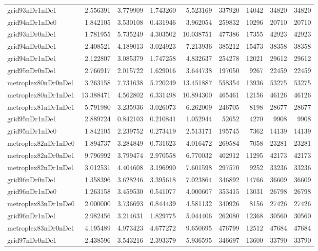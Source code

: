 \begin{longtable}{|l|r|r|r|r|r|r|r|r|}
grid93nDr1nDe1 & 2.556391 & 3.779909 & 1.743260 & 5.523169 & 337920 & 14042 & 34820 & 34820 \\
grid94nDr1nDe0 & 1.842105 & 3.530108 & 0.431946 & 3.962054 & 259832 & 10296 & 20710 & 20710 \\
grid93nDr0nDe1 & 1.781955 & 5.735249 & 4.303502 & 10.038751 & 477386 & 17355 & 42923 & 42923 \\
grid94nDr0nDe1 & 2.408521 & 4.189013 & 3.024923 & 7.213936 & 385212 & 15473 & 38358 & 38358 \\
grid94nDr1nDe1 & 2.122807 & 3.085379 & 1.747258 & 4.832637 & 254278 & 12021 & 29612 & 29612 \\
grid95nDr0nDe1 & 2.766917 & 2.015722 & 1.629016 & 3.644738 & 197050 & 9267 & 22459 & 22459 \\
metroplex80nDr0nDe1 & 3.263158 & 7.731638 & 5.720249 & 13.451887 & 558354 & 13936 & 53275 & 53275 \\
metroplex80nDr1nDe1 & 13.388471 & 4.562802 & 6.331498 & 10.894300 & 465461 & 12156 & 46126 & 46126 \\
metroplex81nDr1nDe1 & 5.791980 & 3.235936 & 3.026073 & 6.262009 & 246705 & 8198 & 28677 & 28677 \\
grid95nDr1nDe1 & 2.889724 & 0.842103 & 0.210841 & 1.052944 & 52652 & 4270 & 9908 & 9908 \\
grid95nDr1nDe0 & 1.842105 & 2.239752 & 0.273419 & 2.513171 & 195745 & 7362 & 14139 & 14139 \\
metroplex82nDr1nDe0 & 1.894737 & 3.284849 & 0.731623 & 4.016472 & 269584 & 7058 & 23281 & 23281 \\
metroplex82nDr0nDe1 & 9.796992 & 3.799474 & 2.970558 & 6.770032 & 402912 & 11295 & 42173 & 42173 \\
metroplex82nDr1nDe1 & 3.012531 & 4.404608 & 3.196990 & 7.601598 & 297570 & 9252 & 33236 & 33236 \\
grid96nDr0nDe1 & 1.358396 & 3.628246 & 3.395618 & 7.023864 & 346892 & 14766 & 36609 & 36609 \\
grid96nDr1nDe0 & 1.263158 & 3.459530 & 0.541077 & 4.000607 & 353415 & 13031 & 26798 & 26798 \\
metroplex83nDr1nDe0 & 2.000000 & 3.736693 & 0.844439 & 4.581132 & 340926 & 8156 & 27426 & 27426 \\
grid96nDr1nDe1 & 2.982456 & 3.214631 & 1.829775 & 5.044406 & 262080 & 12368 & 30560 & 30560 \\
metroplex83nDr0nDe1 & 4.195489 & 4.973423 & 4.677272 & 9.650695 & 476799 & 12512 & 47684 & 47684 \\
grid97nDr0nDe1 & 2.438596 & 3.543216 & 2.393379 & 5.936595 & 346697 & 13600 & 33790 & 33790 \\

\end{longtable}
